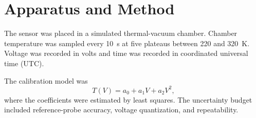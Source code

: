 \chapter{Apparatus and Method}
The sensor was placed in a simulated thermal-vacuum chamber. Chamber temperature
was sampled every 10~s at five plateaus between 220 and 320~K. Voltage was
recorded in volts and time was recorded in coordinated universal time (UTC).

The calibration model was
\begin{equation}
  T(V) = a_0 + a_1 V + a_2 V^2,
  \label{eq:calibration}
\end{equation}
where the coefficients were estimated by least squares. The uncertainty budget
included reference-probe accuracy, voltage quantization, and repeatability.


